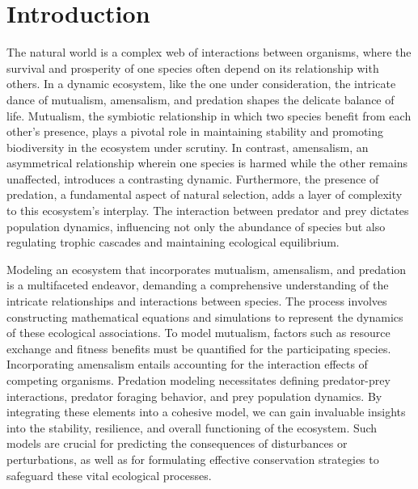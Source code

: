\documentclass[]{interact}
\theoremstyle{plain}%
\theoremstyle{definition}
\theoremstyle{remark}
\numberwithin{equation}{section}
\begin{document}
\section{Introduction}\label{sec:introduction}
The natural world is a complex web of interactions between organisms, where the survival and prosperity of one species often depend on its relationship with others.
In a dynamic ecosystem, like the one under consideration, the intricate dance of mutualism, amensalism, and predation shapes the delicate balance of life.
Mutualism, the symbiotic relationship in which two species benefit from each other's presence, plays a pivotal role in maintaining stability and promoting biodiversity in the ecosystem under scrutiny.
In contrast, amensalism, an asymmetrical relationship wherein one species is harmed while the other remains unaffected, introduces a contrasting dynamic.
Furthermore, the presence of predation, a fundamental aspect of natural selection, adds a layer of complexity to this ecosystem's interplay.
The interaction between predator and prey dictates population dynamics, influencing not only the abundance of species but also regulating trophic cascades and maintaining ecological equilibrium.

Modeling an ecosystem that incorporates mutualism, amensalism, and predation is a multifaceted endeavor, demanding a comprehensive understanding of the intricate relationships and interactions between species.
The process involves constructing mathematical equations and simulations to represent the dynamics of these ecological associations.
To model mutualism, factors such as resource exchange and fitness benefits must be quantified for the participating species.
Incorporating amensalism entails accounting for the interaction effects of competing organisms.
Predation modeling necessitates defining predator-prey interactions, predator foraging behavior, and prey population dynamics.
By integrating these elements into a cohesive model, we can gain invaluable insights into the stability, resilience, and overall functioning of the ecosystem.
Such models are crucial for predicting the consequences of disturbances or perturbations, as well as for formulating effective conservation strategies to safeguard these vital ecological processes.
\end{document}
